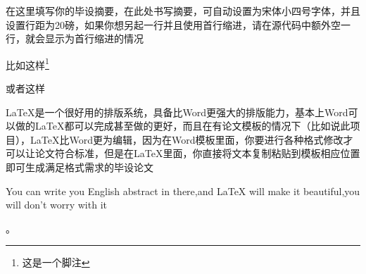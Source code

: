 \documentclass{NCEPUthesis}
\begin{document}


\distanceLogoTitle{2cm}%







\newpage
\NCEPUabstract

\begin{NCEPUabstracttext}
	在这里填写你的毕设摘要，在此处书写摘要，可自动设置为宋体小四号字体，并且设置行距为20磅，如果你想另起一行并且使用首行缩进，请在源代码中额外空一行，就会显示为首行缩进的情况
	
	比如这样\footnote{这是一个脚注}
	
	或者这样
	
	\LaTeX{}是一个很好用的排版系统，具备比Word更强大的排版能力，基本上Word可以做的\LaTeX{}都可以完成甚至做的更好，而且在有论文模板的情况下（比如说此项目），\LaTeX{}比Word更为编辑，因为在Word模板里面，你要进行各种格式修改才可以让论文符合标准，但是在\LaTeX{}里面，你直接将文本复制粘贴到模板相应位置即可生成满足格式需求的毕设论文
\end{NCEPUabstracttext}

\begin{NCEPUenabstract}%
	You can write you English abstract in there,and LaTeX will make it beautiful,you will don't worry with it
\end{NCEPUenabstract}
\tableofcontents%
\newpage
{}%
\newpage%
。


\end{document}
